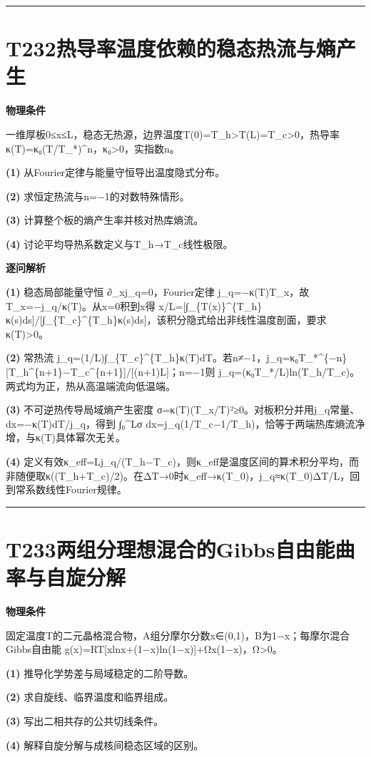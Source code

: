 \documentclass[UTF8,a4paper,11pt,oneside,openany]{ctexbook}
\begin{document}
\par\bigskip\hrule\bigskip
\section*{T232\quad 热导率温度依赖的稳态热流与熵产生}
\textbf{物理条件}\par 一维厚板0≤x≤L，稳态无热源，边界温度T(0)=T\_h>T(L)=T\_c>0，热导率κ(T)=κ₀(T/T\_*)\textasciicircum{}n，κ₀>0，实指数n。
\par\noindent\textbf{(1)} 从Fourier定律与能量守恒导出温度隐式分布。
\par\noindent\textbf{(2)} 求恒定热流与n=−1的对数特殊情形。
\par\noindent\textbf{(3)} 计算整个板的熵产生率并核对热库熵流。
\par\noindent\textbf{(4)} 讨论平均导热系数定义与T\_h→T\_c线性极限。

\par\medskip\noindent\textbf{逐问解析}
\par\noindent\textbf{(1)} 稳态局部能量守恒 ∂\_xj\_q=0，Fourier定律 j\_q=−κ(T)T\_x，故 T\_x=−j\_q/κ(T)。从x=0积到x得 x/L=[∫\_\{T(x)\}\textasciicircum{}\{T\_h\}κ(s)ds]/[∫\_\{T\_c\}\textasciicircum{}\{T\_h\}κ(s)ds]，该积分隐式给出非线性温度剖面，要求κ(T)>0。
\par\noindent\textbf{(2)} 常热流 j\_q=(1/L)∫\_\{T\_c\}\textasciicircum{}\{T\_h\}κ(T)dT。若n≠−1，j\_q=κ₀T\_*\textasciicircum{}\{−n\}[T\_h\textasciicircum{}\{n+1\}−T\_c\textasciicircum{}\{n+1\}]/[(n+1)L]；n=−1则 j\_q=(κ₀T\_*/L)ln(T\_h/T\_c)。两式均为正，热从高温端流向低温端。
\par\noindent\textbf{(3)} 不可逆热传导局域熵产生密度 σ=κ(T)(T\_x/T)²≥0。对板积分并用j\_q常量、dx=−κ(T)dT/j\_q，得到 ∫₀\textasciicircum{}Lσ dx=j\_q(1/T\_c−1/T\_h)，恰等于两端热库熵流净增，与κ(T)具体幂次无关。
\par\noindent\textbf{(4)} 定义有效κ\_eff=Lj\_q/(T\_h−T\_c)，则κ\_eff是温度区间的算术积分平均，而非随便取κ((T\_h+T\_c)/2)。在ΔT→0时κ\_eff→κ(T\_0)，j\_q≈κ(T\_0)ΔT/L，回到常系数线性Fourier规律。

\par\bigskip\hrule\bigskip
\section*{T233\quad 两组分理想混合的Gibbs自由能曲率与自旋分解}
\textbf{物理条件}\par 固定温度T的二元晶格混合物，A组分摩尔分数x∈(0,1)，B为1−x；每摩尔混合Gibbs自由能 g(x)=RT[xlnx+(1−x)ln(1−x)]+Ωx(1−x)，Ω>0。
\par\noindent\textbf{(1)} 推导化学势差与局域稳定的二阶导数。
\par\noindent\textbf{(2)} 求自旋线、临界温度和临界组成。
\par\noindent\textbf{(3)} 写出二相共存的公共切线条件。
\par\noindent\textbf{(4)} 解释自旋分解与成核间稳态区域的区别。
\end{document}

